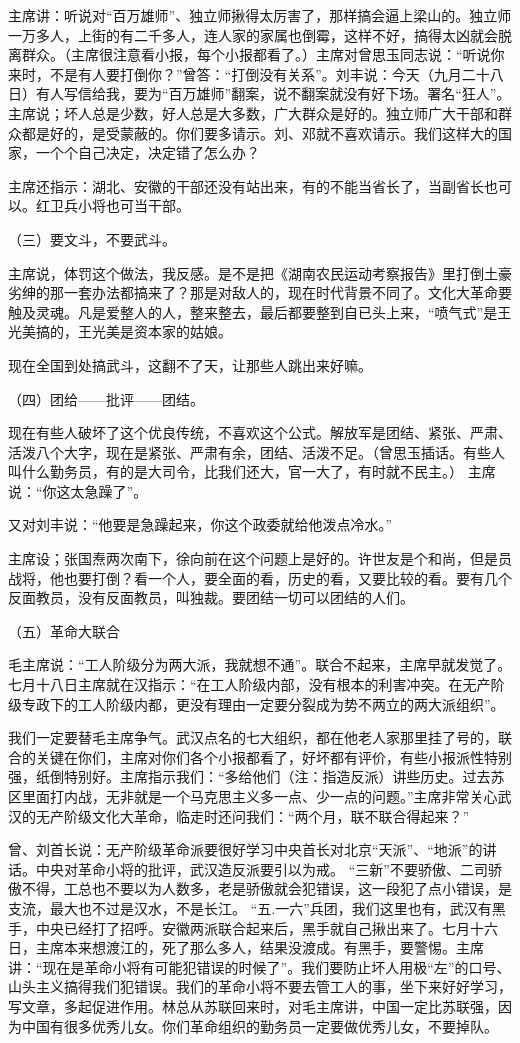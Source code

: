 主席讲：听说对“百万雄师”、独立师揪得太厉害了，那样搞会逼上梁山的。独立师一万多人，上街的有二千多人，连人家的家属也倒霉，这样不好，搞得太凶就会脱离群众。（主席很注意看小报，每个小报都看了。）主席对曾思玉同志说：“听说你来时，不是有人要打倒你？”曾答：“打倒没有关系”。刘丰说：今天（九月二十八日）有人写信给我，要为“百万雄师”翻案，说不翻案就没有好下场。署名“狂人”。主席说；坏人总是少数，好人总是大多数，广大群众是好的。独立师广大干部和群众都是好的，是受蒙蔽的。你们要多请示。刘、邓就不喜欢请示。我们这样大的国家，一个个自己决定，决定错了怎么办？

主席还指示：湖北、安徽的干部还没有站出来，有的不能当省长了，当副省长也可以。红卫兵小将也可当干部。

（三）要文斗，不要武斗。

主席说，体罚这个做法，我反感。是不是把《湖南农民运动考察报告》里打倒土豪劣绅的那一套办法都搞来了？那是对敌人的，现在时代背景不同了。文化大革命要触及灵魂。凡是爱整人的人，整来整去，最后都要整到自已头上来，“喷气式”是王光美搞的，王光美是资本家的姑娘。

现在全国到处搞武斗，这翻不了天，让那些人跳出来好嘛。

（四）团给——批评——团结。

现在有些人破坏了这个优良传统，不喜欢这个公式。解放军是团结、紧张、严肃、活泼八个大字，现在是紧张、严肃有余，团结、活泼不足。（曾思玉插话。有些人叫什么勤务员，有的是大司令，比我们还大，官一大了，有时就不民主。） 主席说：“你这太急躁了”。

又对刘丰说：“他要是急躁起来，你这个政委就给他泼点冷水。”

主席设；张国焘两次南下，徐向前在这个问题上是好的。许世友是个和尚，但是员战将，他也要打倒？看一个人，要全面的看，历史的看，又要比较的看。要有几个反面教员，没有反面教员，叫独裁。要团结一切可以团结的人们。

（五）革命大联合

毛主席说：“工人阶级分为两大派，我就想不通”。联合不起来，主席早就发觉了。七月十八日主席就在汉指示：“在工人阶级内部，没有根本的利害冲突。在无产阶级专政下的工人阶级内都，更没有理由一定要分裂成为势不两立的两大派组织”。

我们一定要替毛主席争气。武汉点名的七大组织，都在他老人家那里挂了号的，联合的关键在你们，主席对你们各个小报都看了，好坏都有评价，有些小报派性特别强，纸倒特别好。主席指示我们：“多给他们（注：指造反派）讲些历史。过去苏区里面打内战，无非就是一个马克思主义多一点、少一点的问题。”主席非常关心武汉的无产阶级文化大革命，临走时还问我们：“两个月，联不联合得起来？”

曾、刘首长说：无产阶级革命派要很好学习中央首长对北京“天派”、“地派”的讲话。中央对革命小将的批评，武汉造反派要引以为戒。  “三新”不要骄傲、二司骄傲不得，工总也不要以为人数多，老是骄傲就会犯错误，这一段犯了点小错误，是支流，最大也不过是汉水，不是长江。 “五.一六”兵团，我们这里也有，武汉有黑手，中央已经打了招呼。安徽两派联合起来后，黑手就自己揪出来了。七月十六日，主席本来想渡江的，死了那么多人，结果没渡成。有黑手，要警惕。主席讲：“现在是革命小将有可能犯错误的时候了”。我们要防止坏人用极“左”的口号、山头主义搞得我们犯错误。我们的革命小将不要去管工人的事，坐下来好好学习，写文章，多起促进作用。林总从苏联回来时，对毛主席讲，中国一定比苏联强，因为中国有很多优秀儿女。你们革命组织的勤务员一定要做优秀儿女，不要掉队。

